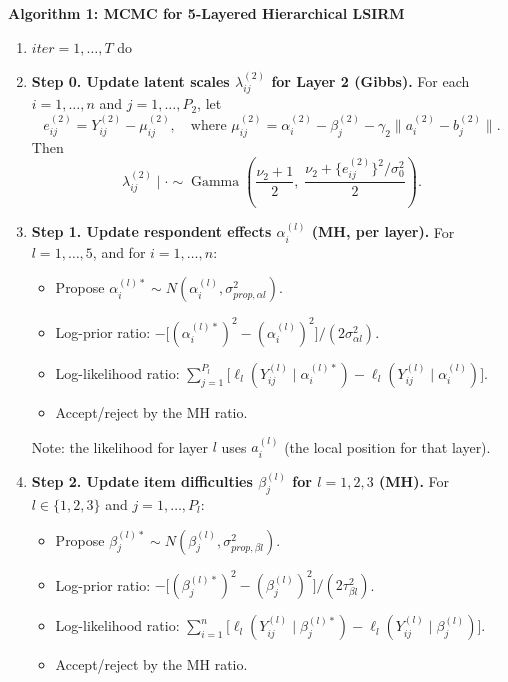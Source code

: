 \documentclass[11pt]{article}
\begin{document}
\bigskip
\noindent
\textbf{Algorithm 1: MCMC for 5-Layered Hierarchical LSIRM}

\begin{enumerate}[leftmargin=1.8em]
    \item[for] $iter=1,\dots,T$ do

    \item \textbf{Step 0. Update latent scales $\lambda_{ij}^{(2)}$ for Layer 2 (Gibbs).}
    For each $i=1,\dots,n$ and $j=1,\dots,P_2$, let
    \[
    e_{ij}^{(2)} = Y_{ij}^{(2)} - \mu_{ij}^{(2)},
    \quad \text{where } \mu_{ij}^{(2)} = \alpha_i^{(2)} - \beta_j^{(2)} - \gamma_2\|a_i^{(2)} - b_j^{(2)}\|.
    \]
    Then
    \[
    \lambda_{ij}^{(2)}\mid \cdot
    \sim
    \operatorname{Gamma}\left(
    \frac{\nu_2+1}{2},\;
    \frac{\nu_2 + \{e_{ij}^{(2)}\}^2/\sigma_0^2}{2}
    \right).
    \]

    \item \textbf{Step 1. Update respondent effects $\alpha_i^{(l)}$ (MH, per layer).}
    For $l=1,\dots,5$, and for $i=1,\dots,n$:
    \begin{itemize}[leftmargin=1.5em]
        \item Propose $\alpha_i^{(l)*}\sim N(\alpha_i^{(l)},\sigma_{prop,\alpha l}^2)$.
        \item Log-prior ratio:
        $-\bigl[(\alpha_i^{(l)*})^2-(\alpha_i^{(l)})^2\bigr]/(2\sigma_{\alpha l}^2)$.
        \item Log-likelihood ratio:
        $\sum_{j=1}^{P_l}\bigl[\ell_l(Y_{ij}^{(l)}\mid \alpha_i^{(l)*})-\ell_l(Y_{ij}^{(l)}\mid \alpha_i^{(l)})\bigr]$.
        \item Accept/reject by the MH ratio.
    \end{itemize}
    Note: the likelihood for layer $l$ uses $a_i^{(l)}$ (the local position for that layer).

    \item \textbf{Step 2. Update item difficulties $\beta_j^{(l)}$ for $l=1,2,3$ (MH).}
    For $l\in\{1,2,3\}$ and $j=1,\dots,P_l$:
    \begin{itemize}[leftmargin=1.5em]
        \item Propose $\beta_j^{(l)*}\sim N(\beta_j^{(l)},\sigma_{prop,\beta l}^2)$.
        \item Log-prior ratio:
        $-\bigl[(\beta_j^{(l)*})^2-(\beta_j^{(l)})^2\bigr]/(2\tau_{\beta l}^2)$.
        \item Log-likelihood ratio:
        $\sum_{i=1}^{n}\bigl[\ell_l(Y_{ij}^{(l)}\mid \beta_j^{(l)*})-\ell_l(Y_{ij}^{(l)}\mid \beta_j^{(l)})\bigr]$.
        \item Accept/reject by the MH ratio.
    \end{itemize}


\end{enumerate}
\end{document}
